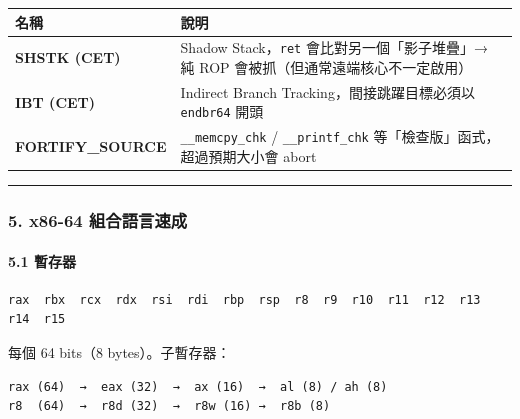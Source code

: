 \documentclass[10pt,a4paper]{article}
\newcounter{none}
\begin{document}
{\def\LTcaptype{none} %
\begin{longtable}[]{@{}
  >{\raggedright\arraybackslash}p{}
  >{\raggedright\arraybackslash}p{}@{}}
\toprule\noalign{}
\begin{minipage}[b]{\linewidth}\raggedright
名稱
\end{minipage} & \begin{minipage}[b]{\linewidth}\raggedright
說明
\end{minipage} \\
\midrule\noalign{}
\endhead
\bottomrule\noalign{}
\endlastfoot
\textbf{SHSTK (CET)} & Shadow Stack，\texttt{ret}
會比對另一個「影子堆疊」→ 純 ROP 會被抓（但通常遠端核心不一定啟用） \\
\textbf{IBT (CET)} & Indirect Branch Tracking，間接跳躍目標必須以
\texttt{endbr64} 開頭 \\
\textbf{FORTIFY\_SOURCE} & \texttt{\_\allowbreak{}\_\allowbreak{}memcpy\_\allowbreak{}chk} /
\texttt{\_\allowbreak{}\_\allowbreak{}printf\_\allowbreak{}chk} 等「檢查版」函式，超過預期大小會 abort \\
\end{longtable}
}

\begin{center}\rule{0.5\linewidth}{0.5pt}\end{center}

\subsubsection{5. x86-64
組合語言速成}\label{x86-64-ux7d44ux5408ux8a9eux8a00ux901fux6210}

\paragraph{5.1 暫存器}\label{ux66abux5b58ux5668}

\begin{Verbatim}[breaklines=true,breakanywhere=true,breakautoindent=false,fontsize=\fontsize{7.0}{9.5}\selectfont]
rax  rbx  rcx  rdx  rsi  rdi  rbp  rsp  r8  r9  r10  r11  r12  r13  r14  r15
\end{Verbatim}

每個 64 bits（8 bytes）。子暫存器：

\begin{Verbatim}[breaklines=true,breakanywhere=true,breakautoindent=false,fontsize=\fontsize{7.0}{9.5}\selectfont]
rax (64)  →  eax (32)  →  ax (16)  →  al (8) / ah (8)
r8  (64)  →  r8d (32)  →  r8w (16) →  r8b (8)
\end{Verbatim}
\end{document}
